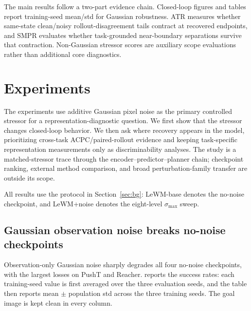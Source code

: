 \documentclass[10pt]{article}
\newcommand{\stdmax}{\ensuremath{\sigma_{\max}}}
\begin{document}
The main results follow a two-part evidence chain. Closed-loop figures and tables report training-seed mean/std for Gaussian robustness. ATR measures whether same-state clean/noisy rollout-disagreement tails contract at recovered endpoints, and SMPR evaluates whether task-grounded near-boundary separations survive that contraction. Non-Gaussian stressor scores are auxiliary scope evaluations rather than additional core diagnostics.


\section{Experiments}\label{sec:exp}

The experiments use additive Gaussian pixel noise as the primary controlled stressor for a representation-diagnostic question. We first show that the stressor changes closed-loop behavior. We then ask where recovery appears in the model, prioritizing cross-task ACPC/paired-rollout evidence and keeping task-specific representation measurements only as discriminability analyses. The study is a matched-stressor trace through the encoder--predictor--planner chain; checkpoint ranking, external method comparison, and broad perturbation-family transfer are outside its scope.

All results use the protocol in Section~\ref{sec:bg}: LeWM-base denotes the no-noise checkpoint, and LeWM+noise denotes the eight-level \stdmax{} sweep.

\subsection{Gaussian observation noise breaks no-noise checkpoints}\label{sec:exp-cliff}

Observation-only Gaussian noise sharply degrades all four no-noise checkpoints, with the largest losses on PushT and Reacher.  reports the success rates: each training-seed value is first averaged over the three evaluation seeds, and the table then reports mean $\pm$ population std across the three training seeds. The goal image is kept clean in every column.
\end{document}
